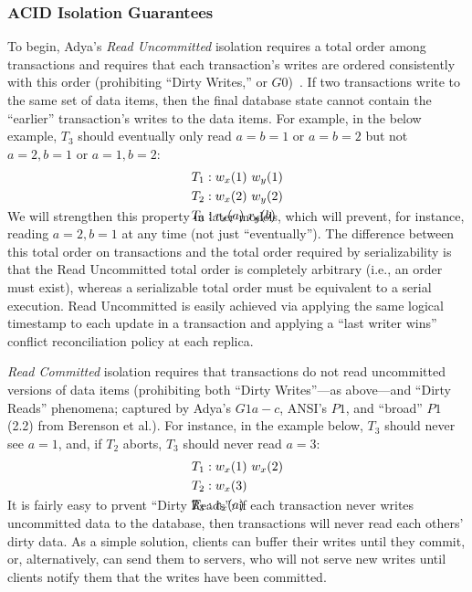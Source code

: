 \subsubsection{ACID Isolation Guarantees}

To begin, Adya's \textit{Read Uncommitted} isolation requires a total
order among transactions and requires that each transaction's writes
are ordered consistently with this order (prohibiting ``Dirty
Writes,'' or $G0$)~\cite{adya}. If two transactions write to the same
set of data items, then the final database state cannot contain the
``earlier'' transaction's writes to the data items. For example, in
the below example, $T_3$ should eventually only read $a=b=1$ or
$a=b=2$ but not $a=2, b=1$ or $a=1, b=2$:
\begin{align*}
\small
T_1 &: w_x(1)~w_y(1)
\\T_2 &: w_x(2)~w_y(2)
\\T_3 &: r_x(a)~r_y(b)\\[-2em]
\end{align*}
We will strengthen this property in later models, which will prevent,
for instance, reading $a=2, b=1$ at any time (not just
``eventually''). The difference between this total order on
transactions and the total order required by serializability is that
the Read Uncommitted total order is completely arbitrary (i.e., an
order must exist), whereas a serializable total order must be
equivalent to a serial execution. Read Uncommitted is easily achieved
via applying the same logical timestamp to each update in a
transaction and applying a ``last writer wins'' conflict
reconciliation policy at each replica.

\textit{Read Committed} isolation requires that transactions do not
read uncommitted versions of data items (prohibiting both ``Dirty
Writes''---as above---and ``Dirty Reads'' phenomena; captured by
Adya's $G1a-c$, ANSI's $P1$, and ``broad'' $P1$ (2.2) from Berenson et
al.). For instance, in the example below, $T_3$ should never see
$a=1$, and, if $T_2$ aborts, $T_3$ should never read $a=3$:
\vspace{-.5em}
\begin{align*}
\small
T_1 &: w_x(1)~w_x(2)
\\T_2 &: w_x(3)\\
T_3 &: r_x(a)\\[-2em]
\end{align*}
It is fairly easy to prvent ``Dirty Reads'': if each transaction never
writes uncommitted data to the database, then transactions will never
read each others' dirty data. As a simple solution, clients can buffer
their writes until they commit, or, alternatively, can send them to
servers, who will not serve new writes until clients notify them that
the writes have been committed.

